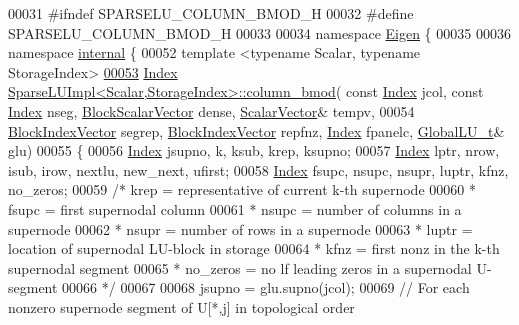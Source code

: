 \begin{DoxyCode}
00031 \textcolor{preprocessor}{#ifndef SPARSELU\_COLUMN\_BMOD\_H}
00032 \textcolor{preprocessor}{#define SPARSELU\_COLUMN\_BMOD\_H}
00033 
00034 \textcolor{keyword}{namespace }\hyperlink{namespace_eigen}{Eigen} \{
00035 
00036 \textcolor{keyword}{namespace }\hyperlink{namespaceinternal}{internal} \{
00052 \textcolor{keyword}{template} <\textcolor{keyword}{typename} Scalar, \textcolor{keyword}{typename} StorageIndex>
\hyperlink{group___sparse_l_u___module_ae34275602cf12560edfcaf7cd5cbe932}{00053} \hyperlink{namespace_eigen_a62e77e0933482dafde8fe197d9a2cfde}{Index} \hyperlink{group___sparse_l_u___module_ae34275602cf12560edfcaf7cd5cbe932}{SparseLUImpl<Scalar,StorageIndex>::column\_bmod}(\textcolor{keyword}{
      const} \hyperlink{namespace_eigen_a62e77e0933482dafde8fe197d9a2cfde}{Index} jcol, \textcolor{keyword}{const} \hyperlink{namespace_eigen_a62e77e0933482dafde8fe197d9a2cfde}{Index} nseg, \hyperlink{group___core___module_class_eigen_1_1_ref}{BlockScalarVector} dense, 
      \hyperlink{group___core___module_class_eigen_1_1_matrix}{ScalarVector}& tempv,
00054                                                      \hyperlink{group___core___module_class_eigen_1_1_ref}{BlockIndexVector} segrep, 
      \hyperlink{group___core___module_class_eigen_1_1_ref}{BlockIndexVector} repfnz, \hyperlink{namespace_eigen_a62e77e0933482dafde8fe197d9a2cfde}{Index} fpanelc, \hyperlink{struct_eigen_1_1internal_1_1_l_u___global_l_u__t}{GlobalLU\_t}& glu)
00055 \{
00056   \hyperlink{namespace_eigen_a62e77e0933482dafde8fe197d9a2cfde}{Index}  jsupno, k, ksub, krep, ksupno; 
00057   \hyperlink{namespace_eigen_a62e77e0933482dafde8fe197d9a2cfde}{Index} lptr, nrow, isub, irow, nextlu, new\_next, ufirst; 
00058   \hyperlink{namespace_eigen_a62e77e0933482dafde8fe197d9a2cfde}{Index} fsupc, nsupc, nsupr, luptr, kfnz, no\_zeros; 
00059   \textcolor{comment}{/* krep = representative of current k-th supernode}
00060 \textcolor{comment}{    * fsupc =  first supernodal column}
00061 \textcolor{comment}{    * nsupc = number of columns in a supernode}
00062 \textcolor{comment}{    * nsupr = number of rows in a supernode}
00063 \textcolor{comment}{    * luptr = location of supernodal LU-block in storage}
00064 \textcolor{comment}{    * kfnz = first nonz in the k-th supernodal segment}
00065 \textcolor{comment}{    * no\_zeros = no lf leading zeros in a supernodal U-segment}
00066 \textcolor{comment}{    */}
00067   
00068   jsupno = glu.supno(jcol);
00069   \textcolor{comment}{// For each nonzero supernode segment of U[*,j] in topological order }

\end{DoxyCode}
